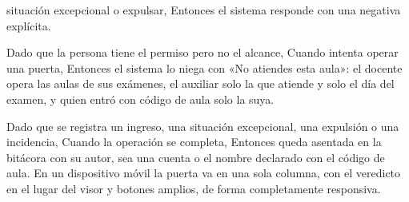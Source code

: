 {      situación excepcional o expulsar, Entonces el sistema responde con una negativa
      explícita.
\item Dado que la persona tiene el permiso pero no el alcance, Cuando intenta operar una
      puerta, Entonces el sistema lo niega con «No atiendes esta aula»: el docente opera
      las aulas de sus exámenes, el auxiliar solo la que atiende y solo el día del examen,
      y quien entró con código de aula solo la suya.
\item Dado que se registra un ingreso, una situación excepcional, una expulsión o una
      incidencia, Cuando la operación se completa, Entonces queda asentada en la bitácora
      con su autor, sea una cuenta o el nombre declarado con el código de aula. En un
      dispositivo móvil la puerta va en una sola columna, con el veredicto en el lugar
      del visor y botones amplios, de forma completamente responsiva.}

\def\HUMockupsExtra{%
\CajaMockup{hu19-admitido}{7.8cm} & \CajaMockup{hu19-otra-aula}{7.8cm}}

